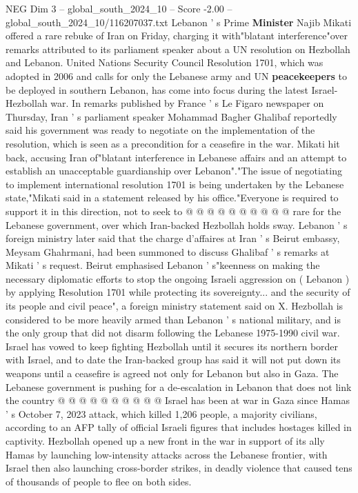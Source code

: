 \begin{textsample}{NEG Dim 3 – global\_south\_2024\_10 – Score -2.00 – global\_south\_2024\_10/116207037.txt}  \label{ex:f3_neg_100}
Lebanon ' s Prime \textbf{Minister} Najib Mikati offered a rare rebuke of Iran on Friday, charging it with"blatant interference"over remarks attributed to its parliament speaker about a UN resolution on Hezbollah and Lebanon.
United Nations Security Council Resolution 1701, which was adopted in 2006 and calls for only the Lebanese army and UN \textbf{peacekeepers} to be deployed in southern Lebanon, has come into focus during the latest Israel-Hezbollah war.
In remarks published by France ' s Le Figaro newspaper on Thursday, Iran ' s parliament speaker Mohammad Bagher Ghalibaf reportedly said his government was ready to negotiate on the implementation of the resolution, which is seen as a precondition for a ceasefire in the war.
Mikati hit back, accusing Iran of"blatant interference in Lebanese affairs and an attempt to establish an unacceptable guardianship over Lebanon"."The issue of negotiating to implement international resolution 1701 is being undertaken by the Lebanese state,"Mikati said in a statement released by his office."Everyone is required to support it in this direction, not to seek to @ @ @ @ @ @ @ @ @ @ rare for the Lebanese government, over which Iran-backed Hezbollah holds sway.
Lebanon ' s foreign ministry later said that the charge d'affaires at Iran ' s Beirut embassy, Meysam Ghahrmani, had been summoned to discuss Ghalibaf ' s remarks at Mikati ' s request.
Beirut emphasised Lebanon ' s"keenness on making the necessary diplomatic efforts to stop the ongoing Israeli aggression on ( Lebanon ) by applying Resolution 1701 while protecting its sovereignty... and the security of its people and civil peace", a foreign ministry statement said on X.
Hezbollah is considered to be more heavily armed than Lebanon ' s national military, and is the only group that did not disarm following the Lebanese 1975-1990 civil war.
Israel has vowed to keep fighting Hezbollah until it secures its northern border with Israel, and to date the Iran-backed group has said it will not put down its weapons until a ceasefire is agreed not only for Lebanon but also in Gaza.
The Lebanese government is pushing for a de-escalation in Lebanon that does not link the country @ @ @ @ @ @ @ @ @ @ Israel has been at war in Gaza since Hamas ' s October 7, 2023 attack, which killed 1,206 people, a majority civilians, according to an AFP tally of official Israeli figures that includes hostages killed in captivity.
Hezbollah opened up a new front in the war in support of its ally Hamas by launching low-intensity attacks across the Lebanese frontier, with Israel then also launching cross-border strikes, in deadly violence that caused tens of thousands of people to flee on both sides.

\end{textsample}
